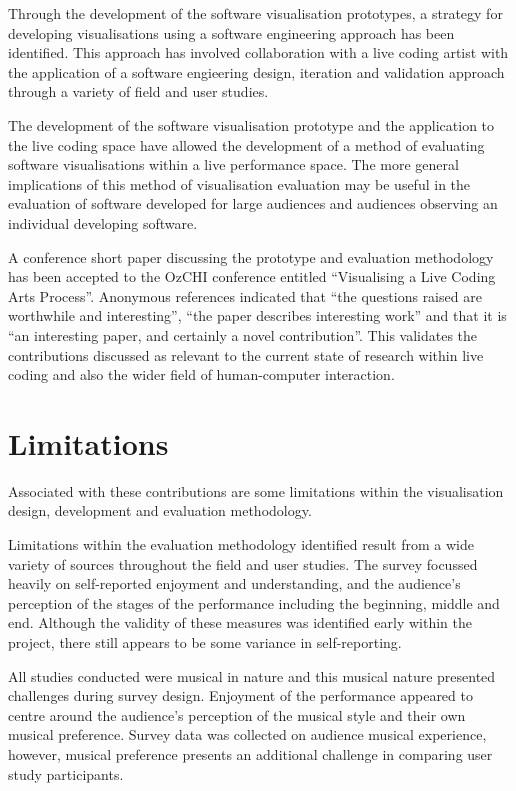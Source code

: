 Through the development of the software visualisation prototypes, a strategy for developing visualisations using a software engineering approach has been identified. This approach has involved collaboration with a live coding artist with the application of a software engieering design, iteration and validation approach through a variety of field and user studies.

The development of the software visualisation prototype and the application to the live coding space have allowed the development of a method of evaluating software visualisations within a live performance space. The more general implications of this method of visualisation evaluation may be useful in the evaluation of software developed for large audiences and audiences observing an individual developing software.

A conference short paper discussing the prototype and evaluation methodology has been accepted to the OzCHI conference entitled ``Visualising a Live Coding Arts Process''. Anonymous references indicated that ``the questions raised are worthwhile and interesting'', ``the paper describes interesting work'' and that it is ``an interesting paper, and certainly a novel contribution''. This validates the contributions discussed as relevant to the current state of research within live coding and also the wider field of human-computer interaction.  

\section{Limitations}

Associated with these contributions are some limitations within the visualisation design, development and evaluation methodology.

Limitations within the evaluation methodology identified result from a wide variety of sources throughout the field and user studies. The survey focussed heavily on self-reported enjoyment and understanding, and the audience's perception of the stages of the performance including the beginning, middle and end. Although the validity of these measures was identified early within the project, there still appears to be some variance in self-reporting.

All studies conducted were musical in nature and this musical nature presented challenges during survey design. Enjoyment of the performance appeared to centre around the audience's perception of the musical style and their own musical preference. Survey data was collected on audience musical experience, however, musical preference presents an additional challenge in comparing user study participants.

